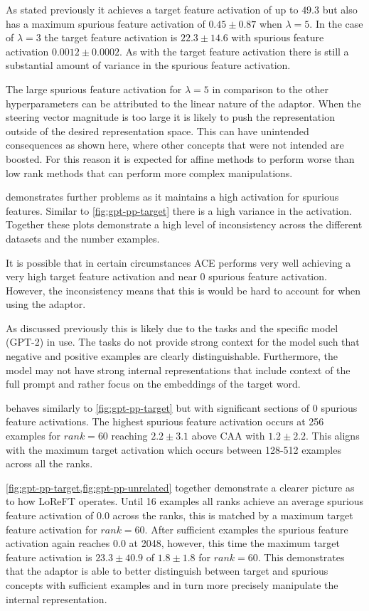 As stated previously it achieves a target feature activation of up to $49.3$ but also has a maximum spurious feature activation of $0.45 \pm 0.87$ when $\lambda = 5$.
In the case of $\lambda = 3$ the target feature activation is $22.3 \pm 14.6$ with spurious feature activation $0.0012 \pm 0.0002$.
As with the target feature activation there is still a substantial amount of variance in the spurious feature activation.

The large spurious feature activation for $\lambda = 5$ in comparison to the other hyperparameters can be attributed to the linear nature of the adaptor.
When the steering vector magnitude is too large it is likely to push the representation outside of the desired representation space.
This can have unintended consequences as shown here, where other concepts that were not intended are boosted.
For this reason it is expected for affine methods to perform worse than low rank methods that can perform more complex manipulations.

 demonstrates further problems as it maintains a high activation for spurious features.
Similar to \cref{fig:gpt-pp-target} there is a high variance in the activation.
Together these plots demonstrate a high level of inconsistency across the different datasets and the number examples.

It is possible that in certain circumstances ACE performs very well achieving a very high target feature activation and near 0 spurious feature activation.
However, the inconsistency means that this is would be hard to account for when using the adaptor.

As discussed previously this is likely due to the tasks and the specific model (GPT-2) in use.
The tasks do not provide strong context for the model such that negative and positive examples are clearly distinguishable.
Furthermore, the model may not have strong internal representations that include context of the full prompt and rather focus on the embeddings of the target word.

 behaves similarly to \cref{fig:gpt-pp-target} but with significant sections of 0 spurious feature activations.
The highest spurious feature activation occurs at 256 examples for $rank = 60$ reaching $2.2 \pm 3.1$ above CAA with $1.2 \pm 2.2$.
This aligns with the maximum target activation which occurs between 128-512 examples across all the ranks.

\cref{fig:gpt-pp-target,fig:gpt-pp-unrelated} together demonstrate a clearer picture as to how LoReFT operates.
Until 16 examples all ranks achieve an average spurious feature activation of $0.0$ across the ranks, this is matched by a maximum target feature activation for $rank = 60$.
After sufficient examples the spurious feature activation again reaches $0.0$ at 2048, however, this time the maximum target feature activation is $23.3 \pm 40.9$ of $1.8 \pm 1.8$ for $rank = 60$.
This demonstrates that the adaptor is able to better distinguish between target and spurious concepts with sufficient examples and in turn more precisely manipulate the internal representation.

